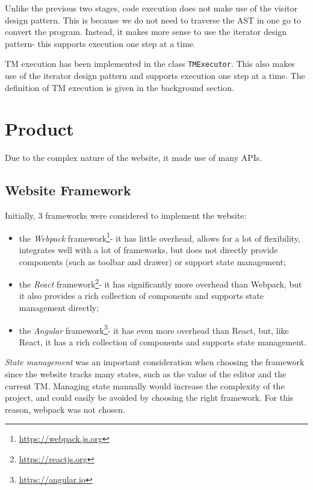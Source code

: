 Unlike the previous two stages, code execution does not make use of the visitor design pattern. This is because we do not need to traverse the AST in one go to convert the program. Instead, it makes more sense to use the iterator design pattern- this supports execution one step at a time.

TM execution has been implemented in the class \texttt{TMExecutor}. This also makes use of the iterator design pattern and supports execution one step at a time. The definition of TM execution is given in the background section.

\section{Product}

Due to the complex nature of the website, it made use of many APIs.

\subsection{Website Framework}

Initially, 3 frameworks were considered to implement the website:
\begin{itemize}
    \item the \emph{Webpack} framework\footnote{\url{https://webpack.js.org}}- it has little overhead, allows for a lot of flexibility, integrates well with a lot of frameworks, but does not directly provide components (such as toolbar and drawer) or support state management;
    \item the \emph{React} framework\footnote{\url{https://reactjs.org}}- it has significantly more overhead than Webpack, but it also provides a rich collection of components and supports state management directly;
    \item the \emph{Angular} framework\footnote{\url{https://angular.io}}- it has even more overhead than React, but, like React, it has a rich collection of components and supports state management.
\end{itemize}

\emph{State management} was an important consideration when choosing the framework since the website tracks many states, such as the value of the editor and the current TM. Managing state manually would increase the complexity of the project, and could easily be avoided by choosing the right framework. For this reason, webpack was not chosen.

